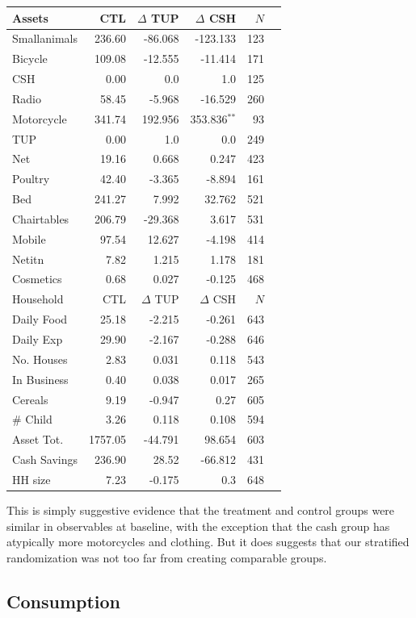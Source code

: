 \documentclass[12pt,article]{article}
\begin{document}
\begin{longtable}{lrrrrr}
\hline
Assets & CTL & \(\Delta\) TUP & \(\Delta\) CSH & \(N\)\\
\hline
Smallanimals & 236.60 & -86.068 & -123.133 & 123\\
Bicycle & 109.08 & -12.555 & -11.414 & 171\\
CSH & 0.00 & 0.0 & 1.0 & 125\\
Radio & 58.45 & -5.968 & -16.529 & 260\\
Motorcycle & 341.74 & 192.956 & 353.836\(^{\text{**}}\) & 93\\
TUP & 0.00 & 1.0 & 0.0 & 249\\
Net & 19.16 & 0.668 & 0.247 & 423\\
Poultry & 42.40 & -3.365 & -8.894 & 161\\
Bed & 241.27 & 7.992 & 32.762 & 521\\
Chairtables & 206.79 & -29.368 & 3.617 & 531\\
Mobile & 97.54 & 12.627 & -4.198 & 414\\
Netitn & 7.82 & 1.215 & 1.178 & 181\\
Cosmetics & 0.68 & 0.027 & -0.125 & 468\\
\hline
Household & CTL & \(\Delta\) TUP & \(\Delta\) CSH & \(N\)\\
\hline
Daily Food & 25.18 & -2.215 & -0.261 & 643\\
Daily Exp & 29.90 & -2.167 & -0.288 & 646\\
No. Houses & 2.83 & 0.031 & 0.118 & 543\\
In Business & 0.40 & 0.038 & 0.017 & 265\\
Cereals & 9.19 & -0.947 & 0.27 & 605\\
\# Child & 3.26 & 0.118 & 0.108 & 594\\
Asset Tot. & 1757.05 & -44.791 & 98.654 & 603\\
Cash Savings & 236.90 & 28.52 & -66.812 & 431\\
HH size & 7.23 & -0.175 & 0.3 & 648\\
\hline
\end{longtable}

This is simply suggestive evidence that the treatment and control groups were similar
in observables at baseline, with the exception that the cash group has atypically
more motorcycles and clothing. But it does suggests that our stratified randomization
was not too far from creating comparable groups.

\subsection{Consumption}
\label{sec:orgheadline8}
\end{document}
